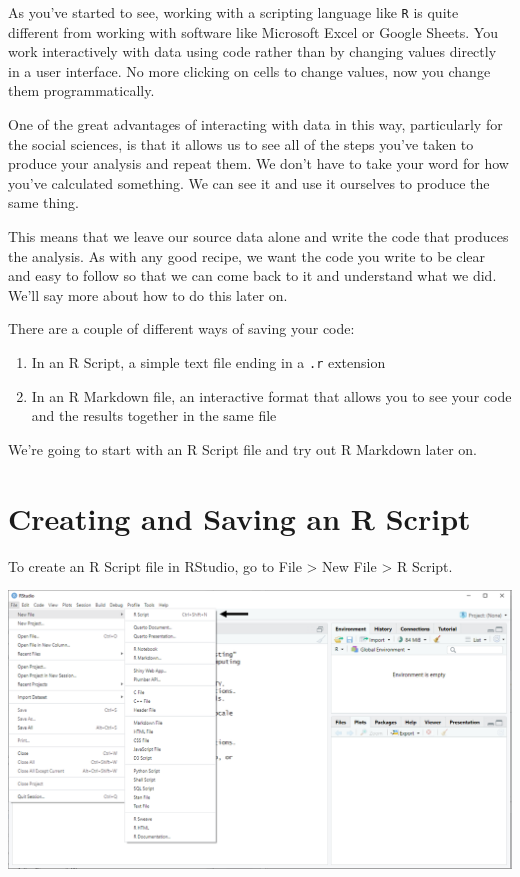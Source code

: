 \documentclass[
]{book}
\begin{document}
As you've started to see, working with a scripting language like \texttt{R} is quite different from working with software like Microsoft Excel or Google Sheets. You work interactively with data using code rather than by changing values directly in a user interface. No more clicking on cells to change values, now you change them programmatically.

One of the great advantages of interacting with data in this way, particularly for the social sciences, is that it allows us to see all of the steps you've taken to produce your analysis and repeat them. We don't have to take your word for how you've calculated something. We can see it and use it ourselves to produce the same thing.

This means that we leave our source data alone and write the code that produces the analysis. As with any good recipe, we want the code you write to be clear and easy to follow so that we can come back to it and understand what we did. We'll say more about how to do this later on.

There are a couple of different ways of saving your code:

\begin{enumerate}
\def\labelenumi{\arabic{enumi}.}
\item
  In an R Script, a simple text file ending in a \texttt{.r} extension
\item
  In an R Markdown file, an interactive format that allows you to see your code and the results together in the same file
\end{enumerate}

We're going to start with an R Script file and try out R Markdown later on.

\hypertarget{creating-and-saving-an-r-script}{%
\section{Creating and Saving an R Script}\label{creating-and-saving-an-r-script}}

To create an R Script file in RStudio, go to File \textgreater{} New File \textgreater{} R Script.

\includegraphics{docs/_main_files/figure-html/RStudio_Opening an R Script File.png}
\end{document}
